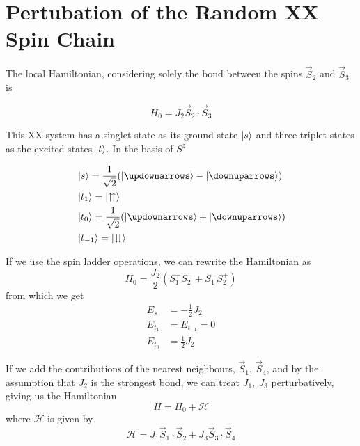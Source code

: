 \documentclass[../main.tex]{subfiles}
\begin{document}
\chapter{Pertubation of the Random XX Spin Chain}
\label{appendix:pert}

The local Hamiltonian, considering solely the bond between the spins $\vec{S}_{2}$ and $\vec{S}_{3}$ is

\begin{equation}
H_{0} = J_{2} \vec{S}_{2}\cdot \vec{S}_{3}
\end{equation}

This XX system has a singlet state as its ground state $\ket{s}$ and three triplet states as the excited states $\ket{t}$. In the basis of $S^{z}$

\begin{align}
    &\ket{s} = \frac{1}{\sqrt{2}}(\ket{\updownarrows}-\ket{\downuparrows})\\
    &\ket{t_{1}} = \ket{\upuparrows}\\
    &\ket{t_{0}} = \frac{1}{\sqrt{2}}(\ket{\updownarrows} + \ket{\downuparrows})\\
    &\ket{t_{-1}} = \ket{\downdownarrows}
\end{align}

If we use the spin ladder operations, we can rewrite the Hamiltonian as
\begin{equation}
    H_0=\frac{J_{2}}{2}(S_{1}^{+}S_{2}^{-}+S_{1}^{-}S_{2}^{+})
    \label{eq:spinlad}
\end{equation}
from which we get
\begin{equation}
\begin{split}
E_s &= -\frac{1}{2}J_{2}\\
E_{t_{1}} &= E_{t_{-1}} = 0\\
E_{t_{0}} &= \frac{1}{2}J_{2}
\end{split}
\end{equation}

If we add the contributions of the nearest neighbours, $\vec{S}_{1},\ \vec{S}_{4}$, and by the assumption that $J_{2}$ is the strongest bond, we can treat $J_{1},\ J_{3}$ perturbatively, giving us the Hamiltonian
\begin{equation}
    H=H_{0}+\mathcal{H}
\end{equation}
where $\mathcal{H}$ is given by
\begin{equation}
    \mathcal{H}=J_{1}\vec{S}_{1}\cdot\vec{S}_{2}+J_{3}\vec{S}_{3}\cdot\vec{S}_{4}
\end{equation}
\end{document}
